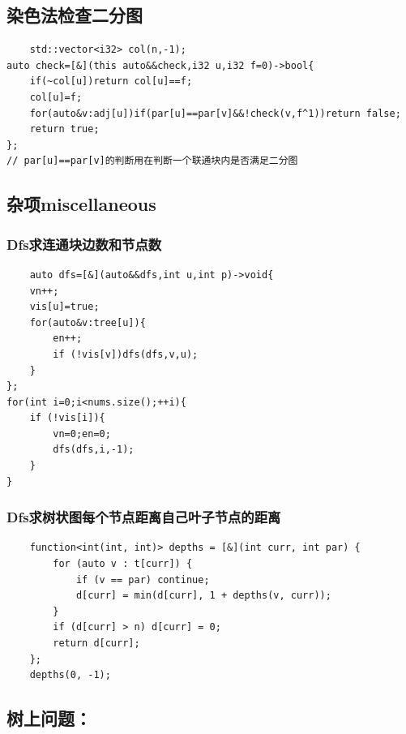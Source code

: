 \documentclass[UTF8,twoside]{ctexart}
\begin{document}
\subsection{染色法检查二分图}
\begin{lstlisting}
    std::vector<i32> col(n,-1);
auto check=[&](this auto&&check,i32 u,i32 f=0)->bool{
    if(~col[u])return col[u]==f;
    col[u]=f;
    for(auto&v:adj[u])if(par[u]==par[v]&&!check(v,f^1))return false;
    return true;
};
// par[u]==par[v]的判断用在判断一个联通块内是否满足二分图
\end{lstlisting}
\subsection{杂项miscellaneous}
\subsubsection{Dfs求连通块边数和节点数}
\begin{lstlisting}
    auto dfs=[&](auto&&dfs,int u,int p)->void{
    vn++;
    vis[u]=true;
    for(auto&v:tree[u]){
        en++;
        if (!vis[v])dfs(dfs,v,u);
    }
};
for(int i=0;i<nums.size();++i){
    if (!vis[i]){
        vn=0;en=0;
        dfs(dfs,i,-1);
    }
}
\end{lstlisting}
\subsubsection{Dfs求树状图每个节点距离自己叶子节点的距离}
\begin{lstlisting}
    function<int(int, int)> depths = [&](int curr, int par) {
		for (auto v : t[curr]) {
			if (v == par) continue;
			d[curr] = min(d[curr], 1 + depths(v, curr));
		}
		if (d[curr] > n) d[curr] = 0;
		return d[curr];
	};
	depths(0, -1);
\end{lstlisting}
\subsection{树上问题：}
\end{document}
